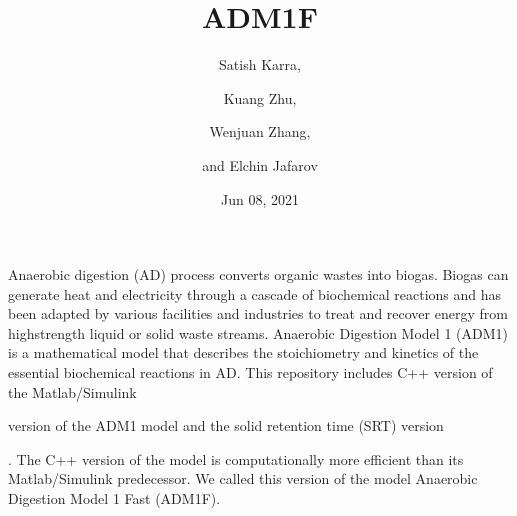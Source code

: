 \documentclass[a4paper,10pt,english]{sphinxmanual}
\title{ADM1F}
\date{Jun 08, 2021}
\author{Satish Karra,\and Kuang Zhu,\and Wenjuan Zhang,\and and Elchin Jafarov}
\let\sphinxpxdimen\pdfpxdimen\else\newdimen\sphinxpxdimen
\begin{document}
\pagestyle{empty}
\sphinxmaketitle
\pagestyle{plain}
\sphinxtableofcontents
\pagestyle{normal}
\label{\detokenize{index::doc}}


\sphinxAtStartPar
Anaerobic digestion (AD) process converts organic wastes into biogas. Biogas can generate heat and electricity through a cascade of biochemical reactions and has been adapted by various facilities and industries to treat and recover energy from high\sphinxhyphen{}strength liquid or solid waste streams. Anaerobic Digestion Model 1 (ADM1) is a mathematical model that describes the stoichiometry and kinetics of the essential biochemical reactions in AD. This repository includes C++ version of the Matlab/Simulink %
\begin{footnote}[1]\sphinxAtStartFootnote
{}
%
\end{footnote} version of the ADM1 model and the solid retention time (SRT) version %
\begin{footnote}[2]\sphinxAtStartFootnote
{}
%
\end{footnote}. The C++ version of the model is computationally more efficient than its Matlab/Simulink predecessor. We called this version of the model Anaerobic Digestion Model 1 Fast (ADM1F).

\noindent\sphinxincludegraphics[width=1216\sphinxpxdimen,height=685\sphinxpxdimen]{{digester_m}.png}
\end{document}
